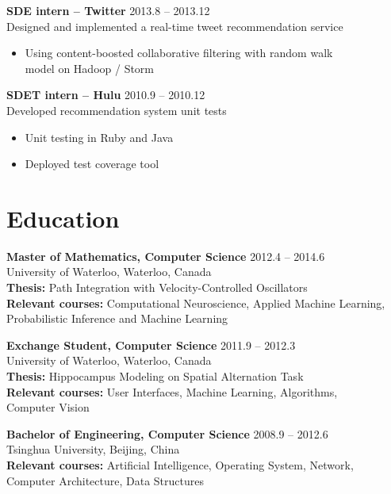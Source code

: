 \documentclass[margin]{res}
\begin{document}
\begin{resume}
{\bf SDE intern -- Twitter} \hfill 2013.8 -- 2013.12\\
Designed and implemented a real-time tweet recommendation service
\begin{itemize} \itemsep -2pt
\item Using content-boosted collaborative filtering with random walk\\ model on Hadoop / Storm
\end{itemize}

{\bf SDET intern -- Hulu} \hfill 2010.9 -- 2010.12\\
Developed recommendation system unit tests
\begin{itemize} \itemsep -2pt
\item Unit testing in Ruby and Java
\item Deployed test coverage tool
\end{itemize} 

\section{Education}

 {\bf Master of Mathematics, Computer Science} \hfill 2012.4 -- 2014.6\\
 University of Waterloo, Waterloo, Canada\\
 {\bf Thesis:} Path Integration with Velocity-Controlled Oscillators\\
 {\bf Relevant courses:} Computational Neuroscience,  Applied Machine Learning,\\
 Probabilistic Inference and Machine Learning
 
 {\bf Exchange Student, Computer Science} \hfill 2011.9 -- 2012.3\\
 University of Waterloo, Waterloo, Canada\\
 {\bf Thesis:} Hippocampus Modeling on Spatial Alternation Task\\
 {\bf Relevant courses:} User Interfaces, Machine Learning, Algorithms, \\
 Computer Vision
 
 {\bf Bachelor of Engineering, Computer Science} \hfill 2008.9 -- 2012.6\\
 Tsinghua University, Beijing, China\\
 {\bf Relevant courses:} Artificial Intelligence, Operating System, Network, \\
 Computer Architecture, Data Structures




\end{resume}
\end{document}
